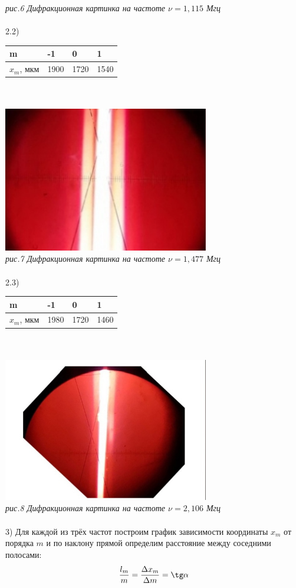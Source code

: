 \documentclass[a4paper]{article}
\begin{document}
\begin{multicols}{2}
\begin{enumerate}
\begin{enumerate}
\textit{рис.6 Дифракционная картинка на частоте $\nu = 1,115$ Мгц}\\
\\
2.2) \begin{tabular}{|l|l|l|l|}
\hline
m & -1 & 0 & 1\\
\hline
$x_m$, мкм & 1900 & 1720 & 1540\\
\hline
\end{tabular}\\
\\
\includegraphics[width=9cm]{exp6}\\
\textit{рис.7 Дифракционная картинка на частоте $\nu = 1,477$ Мгц}\\
\\
2.3) \begin{tabular}{|l|l|l|l|}
\hline
m & -1 & 0 & 1\\
\hline
$x_m$, мкм & 1980 & 1720 & 1460\\
\hline
\end{tabular}\\
\\
\includegraphics[width=9cm]{exp7}\\
\textit{рис.8 Дифракционная картинка на частоте $\nu = 2,106$ Мгц}\\
\\
3) Для каждой из трёх частот построим график зависимости координаты $x_m$ от порядка $m$ и по наклону прямой определим расстояние между соседними полосами: $$\frac{l_m}{m} = \frac{\Delta x_m}{\Delta m} = \tg \alpha$$

\end{enumerate}
\end{enumerate}
\end{multicols}
\end{document}
